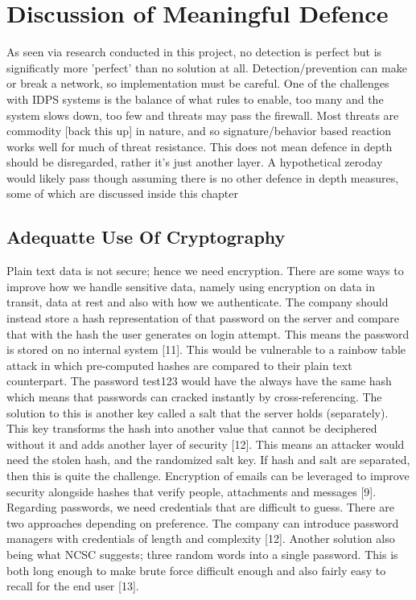 \chapter {Discussion of Meaningful Defence}
As seen via research conducted in this project, no detection is perfect but is significatly more 'perfect' than no solution at all. Detection/prevention can make or break a network, so implementation must be careful. One of the challenges with IDPS systems is the balance of what rules to enable, too many and the system slows down, too few and threats may pass the firewall.
Most threats are commodity [back this up] in nature, and so signature/behavior based reaction works well for much of threat resistance. This does not mean defence in depth should be disregarded, rather it's just another layer. A hypothetical zeroday would likely pass though assuming there is no other defence in depth measures, some of which are discussed inside this chapter


\section {Adequatte Use Of Cryptography}
Plain text data is not secure; hence we need encryption. There are some ways to improve how we handle sensitive data, namely using encryption on data in transit, data at rest and also with how we authenticate. The company should instead store a hash representation of that password on the server and compare that with the hash the user generates on login attempt. This means the password is stored on no internal system [11].
This would be vulnerable to a rainbow table attack in which pre-computed hashes are compared to their plain text counterpart. The password test123 would have the always have the same hash which means that passwords can cracked instantly by cross-referencing. The solution to this is another key called a salt that the server holds (separately). This key transforms the hash into another value that cannot be deciphered without it and adds another layer of security [12]. This means an attacker would need the stolen hash, and the randomized salt key. If hash and salt are separated, then this is quite the challenge.
Encryption of emails can be leveraged to improve security alongside hashes that verify people, attachments and messages [9].
Regarding passwords, we need credentials that are difficult to guess. There are two approaches depending on preference. The company can introduce password managers with credentials of length and complexity [12]. Another solution also being what NCSC suggests; three random words into a single password. This is both long enough to make brute force difficult enough and also fairly easy to recall for the end user [13].

